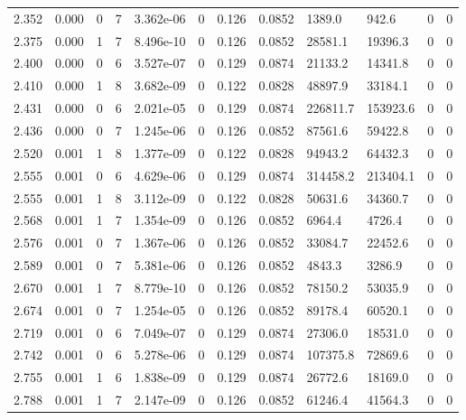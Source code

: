 \documentclass[preview]{standalone}
\begin{document}
{{{\begin{tabular}{L{1.2cm}C{1.2cm} C{0.3cm}C{0.5cm} C{1.4cm}C{1.4cm} C{1.4cm}C{1.4cm} C{1.6cm}C{1.6cm} C{1.6cm}C{1.6cm}}
  2.352  &  0.000  & 0     &  7 &  3.362e-06  & 0  &  0.126&   0.0852& 1389.0 & 942.6   &  0 & 0  \\ 
  2.375  &  0.000  & 1     &  7 &  8.496e-10  & 0  &  0.126&   0.0852& 28581.1 & 19396.3   &  0 & 0  \\ 
  2.400  &  0.000  & 0     &  6 &  3.527e-07  & 0  &  0.129&   0.0874& 21133.2 & 14341.8   &  0 & 0  \\ 
  2.410  &  0.000  & 1     &  8 &  3.682e-09  & 0  &  0.122&   0.0828& 48897.9 & 33184.1   &  0 & 0  \\ 
  2.431  &  0.000  & 0     &  6 &  2.021e-05  & 0  &  0.129&   0.0874& 226811.7 & 153923.6   &  0 & 0  \\ 
  2.436  &  0.000  & 0     &  7 &  1.245e-06  & 0  &  0.126&   0.0852& 87561.6 & 59422.8   &  0 & 0  \\ 
  2.520  &  0.001  & 1     &  8 &  1.377e-09  & 0  &  0.122&   0.0828& 94943.2 & 64432.3   &  0 & 0  \\ 
  2.555  &  0.001  & 0     &  6 &  4.629e-06  & 0  &  0.129&   0.0874& 314458.2 & 213404.1   &  0 & 0  \\ 
  2.555  &  0.001  & 1     &  8 &  3.112e-09  & 0  &  0.122&   0.0828& 50631.6 & 34360.7   &  0 & 0  \\ 
  2.568  &  0.001  & 1     &  7 &  1.354e-09  & 0  &  0.126&   0.0852& 6964.4 & 4726.4   &  0 & 0  \\ 
  2.576  &  0.001  & 0     &  7 &  1.367e-06  & 0  &  0.126&   0.0852& 33084.7 & 22452.6   &  0 & 0  \\ 
  2.589  &  0.001  & 0     &  7 &  5.381e-06  & 0  &  0.126&   0.0852& 4843.3 & 3286.9   &  0 & 0  \\ 
  2.670  &  0.001  & 1     &  7 &  8.779e-10  & 0  &  0.126&   0.0852& 78150.2 & 53035.9   &  0 & 0  \\ 
  2.674  &  0.001  & 0     &  7 &  1.254e-05  & 0  &  0.126&   0.0852& 89178.4 & 60520.1   &  0 & 0  \\ 
  2.719  &  0.001  & 0     &  6 &  7.049e-07  & 0  &  0.129&   0.0874& 27306.0 & 18531.0   &  0 & 0  \\ 
  2.742  &  0.001  & 0     &  6 &  5.278e-06  & 0  &  0.129&   0.0874& 107375.8 & 72869.6   &  0 & 0  \\ 
  2.755  &  0.001  & 1     &  6 &  1.838e-09  & 0  &  0.129&   0.0874& 26772.6 & 18169.0   &  0 & 0  \\ 
  2.788  &  0.001  & 1     &  7 &  2.147e-09  & 0  &  0.126&   0.0852& 61246.4 & 41564.3   &  0 & 0  \\ 

\end{tabular}}}}
\end{document}
